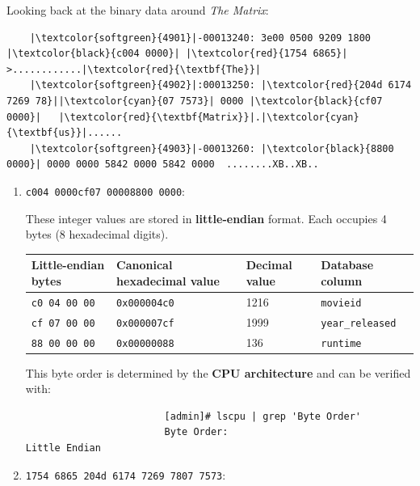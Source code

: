 \documentclass[10pt,a4paper]{article}
\begin{document}
Looking back at the binary data around \textit{The Matrix}:
\begin{verbatim}
    |\textcolor{softgreen}{4901}|-00013240: 3e00 0500 9209 1800 |\textcolor{black}{c004 0000}| |\textcolor{red}{1754 6865}|  >............|\textcolor{red}{\textbf{The}}|
    |\textcolor{softgreen}{4902}|:00013250: |\textcolor{red}{204d 6174 7269 78}||\textcolor{cyan}{07 7573}| 0000 |\textcolor{black}{cf07 0000}|   |\textcolor{red}{\textbf{Matrix}}|.|\textcolor{cyan}{\textbf{us}}|......
    |\textcolor{softgreen}{4903}|-00013260: |\textcolor{black}{8800 0000}| 0000 0000 5842 0000 5842 0000  ........XB..XB..
\end{verbatim}
\begin{enumerate}
    \item \texttt{c004 0000}\quad\texttt{cf07 0000}\quad\texttt{8800 0000}:

          These integer values are stored in \textbf{little-endian} format. Each
          occupies 4 bytes (8 hexadecimal digits).
          \begin{center}
              \small
              \begin{tabular}{@{}llll@{}}
                  \toprule
                  Little-endian bytes  & Canonical hexadecimal value & Decimal value & Database column         \\
                  \midrule
                  \texttt{c0 04 00 00} & \texttt{0x000004c0}         & 1216          & \texttt{movieid}        \\
                  \texttt{cf 07 00 00} & \texttt{0x000007cf}         & 1999          & \texttt{year\_released} \\
                  \texttt{88 00 00 00} & \texttt{0x00000088}         & 136           & \texttt{runtime}        \\
                  \bottomrule
              \end{tabular}
          \end{center}
          This byte order is determined by the \textbf{CPU architecture} and can
          be verified with:
          \begin{verbatim}
                        [admin]# lscpu | grep 'Byte Order'
                        Byte Order:                              Little Endian
                    \end{verbatim}
    \item \texttt{1754 6865 204d 6174 7269 78}\quad\texttt{07 7573}:


\end{enumerate}
\end{document}
